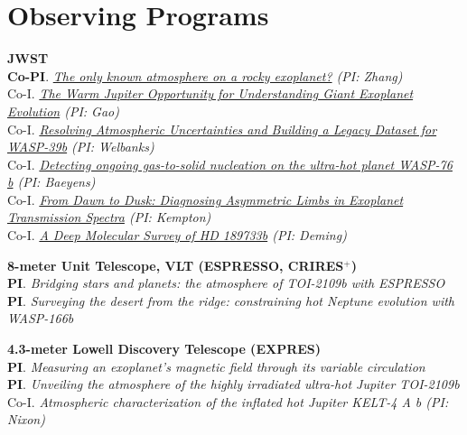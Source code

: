 \documentclass[letterpaper,11pt]{article}
\newcommand{\shorterSection}[1]{\vspace{-10pt}\section{#1}}
\begin{document}
\shorterSection{Observing Programs}

\small
  \begin{list}{}{\cvlist}  

  
  
  \item[{\color{numcolor}}]\textbf{JWST} \\
\textbf{Co-PI}. \textit{\href{https://www.stsci.edu/jwst/science-execution/program-information?id=7875}{The only known atmosphere on a rocky exoplanet?} (PI: Zhang)} \\
Co-I. \textit{\href{https://www.stsci.edu/jwst/science-execution/program-information?id=9025}{The Warm Jupiter Opportunity for Understanding Giant Exoplanet Evolution} (PI: Gao)} \\
Co-I. \textit{\href{https://www.stsci.edu/jwst/science-execution/program-information?id=8017}{Resolving Atmospheric Uncertainties and Building a Legacy Dataset for WASP-39b} (PI: Welbanks)} \\
  Co-I. \textit{\href{https://www.stsci.edu/jwst/science-execution/program-information?id=6045}{Detecting ongoing gas-to-solid nucleation on the ultra-hot planet WASP-76 b} (PI: Baeyens)} \\
  Co-I. \textit{\href{https://www.stsci.edu/jwst/science-execution/program-information?id=5275}{From Dawn to Dusk: Diagnosing Asymmetric Limbs in Exoplanet Transmission Spectra} (PI: Kempton)} \\ 
  Co-I. \textit{\href{https://www.stsci.edu/jwst/science-execution/program-information?id=1633}{A Deep Molecular Survey of HD 189733b} (PI: Deming)}

  \item[{\color{numcolor}}]\textbf{8-meter Unit Telescope, VLT (ESPRESSO, CRIRES$^+$)} \\
\textbf{PI}. \textit{Bridging stars and planets: the atmosphere of TOI-2109b with ESPRESSO} \\
\textbf{PI}. \textit{Surveying the desert from the ridge: constraining hot Neptune evolution with WASP-166b} \\

  \item[{\color{numcolor}}]\textbf{4.3-meter Lowell Discovery Telescope (EXPRES)} \\
      \textbf{PI}. \textit{Measuring an exoplanet’s magnetic field through its variable circulation}\\
     \textbf{PI}. \textit{Unveiling the atmosphere of the highly irradiated ultra-hot Jupiter TOI-2109b}\\
     Co-I. \textit{Atmospheric characterization of the inflated hot Jupiter KELT-4 A b (PI: Nixon)}


\end{list}
\end{document}
